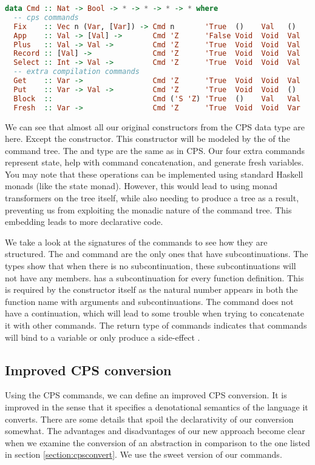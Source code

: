 \begin{lstlisting}[language=Haskell]
data Cmd :: Nat -> Bool -> * -> * -> * -> * where
  -- cps commands
  Fix    :: Vec n (Var, [Var]) -> Cmd n       'True  ()    Val   ()
  App    :: Val -> [Val] ->       Cmd 'Z      'False Void  Void  Val 
  Plus   :: Val -> Val ->         Cmd 'Z      'True  Void  Void  Val
  Record :: [Val] ->              Cmd 'Z      'True  Void  Void  Val
  Select :: Int -> Val ->         Cmd 'Z      'True  Void  Void  Val
  -- extra compilation commands
  Get    :: Var ->                Cmd 'Z      'True  Void  Void  Val
  Put    :: Var -> Val ->         Cmd 'Z      'True  Void  Void  ()
  Block  ::                       Cmd ('S 'Z) 'True  ()    Val   Val
  Fresh  :: Var ->                Cmd 'Z      'True  Void  Void  Var
\end{lstlisting}

We can see that almost all our original constructors from the \ac{CPS} data type are here. Except the  constructor. This constructor will be modeled by the  of the command tree. The  and  type are the same as in \ac{CPS}. Our four extra commands represent state, help with command concatenation, and generate fresh variables. You may note that these operations can be implemented using standard Haskell monads (like the state monad). However, this would lead to using monad transformers on the tree itself, while also needing to produce a tree as a result, preventing us from exploiting the monadic nature of the command tree. This embedding leads to more declarative code.

We take a look at the signatures of the commands to see how they are structured. The  and  command are the only ones that have subcontinuations. The  types show that when there is no subcontinuation, these subcontinuations will not have any members.  has a subcontinuation for every function definition. This is required by the constructor itself as the natural number  appears in both the function name with arguments and subcontinuations. The  command does not have a continuation, which will lead to some trouble when trying to concatenate it with other commands. The return type of commands indicates that commands will bind to a variable  or only produce a side-effect \lstinlineb{()}.

\subsection{\label{section:impcpsconvert}Improved CPS conversion}
Using the \ac{CPS} commands, we can define an improved \ac{CPS} conversion. It is improved in the sense that it specifies a denotational semantics\autocite{DBLP:conf/tacs/CartwrightF94} of the language it converts. There are some details that spoil the declarativity of our conversion somewhat. The advantages and disadvantages of our new approach become clear when we examine the conversion of an abstraction in comparison to the one listed in section \ref{section:cpsconvert}. We use the sweet version of our commands.


